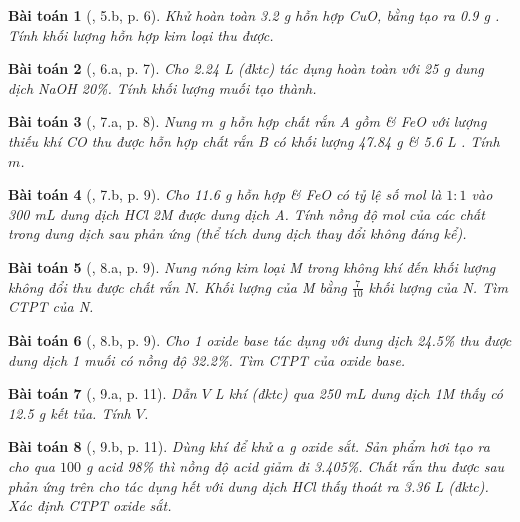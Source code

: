 \documentclass{article}
\newtheorem{baitoan}{Bài toán}
\begin{document}
\begin{baitoan}[\cite{An_350_BT_Hoa_Hoc_9}, 5.b, p. 6]
	Khử hoàn toàn \emph{3.2 g} hỗn hợp \emph{CuO, } bằng \emph{} tạo ra \emph{0.9 g }. Tính khối lượng hỗn hợp kim loại thu được.
\end{baitoan}

\begin{baitoan}[\cite{An_350_BT_Hoa_Hoc_9}, 6.a, p. 7]
	Cho \emph{2.24 L } (đktc) tác dụng hoàn toàn với \emph{25 g} dung dịch \emph{NaOH 20\%}. Tính khối lượng muối tạo thành.
\end{baitoan}

\begin{baitoan}[\cite{An_350_BT_Hoa_Hoc_9}, 7.a, p. 8]
	Nung $m$ \emph{g} hỗn hợp chất rắn A gồm \emph{} \& \emph{FeO} với lượng thiếu khí \emph{CO} thu được hỗn hợp chất rắn B có khối lượng \emph{47.84 g} \& \emph{5.6 L }. Tính $m$.
\end{baitoan}

\begin{baitoan}[\cite{An_350_BT_Hoa_Hoc_9}, 7.b, p. 9]
	Cho \emph{11.6 g} hỗn hợp \emph{} \& \emph{FeO} có tỷ lệ số mol là $1:1$ vào \emph{300 mL} dung dịch \emph{HCl 2M} được dung dịch A. Tính nồng độ mol của các chất trong dung dịch sau phản ứng (thể tích dung dịch thay đổi không đáng kể).
\end{baitoan}

\begin{baitoan}[\cite{An_350_BT_Hoa_Hoc_9}, 8.a, p. 9]
	Nung nóng kim loại M trong không khí đến khối lượng không đổi thu được chất rắn N. Khối lượng của M bằng $\frac{7}{10}$ khối lượng của N. Tìm CTPT của N.
\end{baitoan}

\begin{baitoan}[\cite{An_350_BT_Hoa_Hoc_9}, 8.b, p. 9]
	Cho 1 oxide base tác dụng với dung dịch \emph{ 24.5\%} thu được dung dịch 1 muối có nồng độ \emph{32.2\%}. Tìm CTPT của oxide base.
\end{baitoan}

\begin{baitoan}[\cite{An_350_BT_Hoa_Hoc_9}, 9.a, p. 11]
	Dẫn $V$ \emph{L} khí \emph{} (đktc) qua \emph{250 mL} dung dịch \emph{ 1M} thấy có \emph{12.5 g} kết tủa. Tính $V$.
\end{baitoan}

\begin{baitoan}[\cite{An_350_BT_Hoa_Hoc_9}, 9.b, p. 11]
	Dùng khí \emph{} để khử $a$ \emph{g} oxide sắt. Sản phẩm hơi tạo ra cho qua $100$ \emph{g} acid \emph{ 98\%} thì nồng độ acid giảm đi \emph{3.405\%}. Chất rắn thu được sau phản ứng trên cho tác dụng hết với dung dịch \emph{HCl} thấy thoát ra \emph{3.36 L} \emph{} (đktc). Xác định CTPT oxide sắt.
\end{baitoan}
\end{document}
